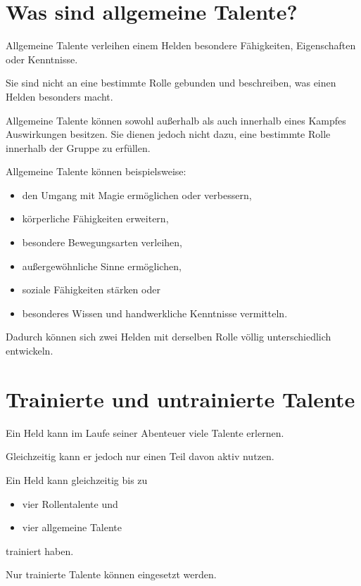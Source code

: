 \section{Was sind allgemeine Talente?}

Allgemeine Talente verleihen einem Helden besondere Fähigkeiten, Eigenschaften oder Kenntnisse.

Sie sind nicht an eine bestimmte Rolle gebunden und beschreiben, was einen Helden besonders macht.

Allgemeine Talente können sowohl außerhalb als auch innerhalb eines Kampfes Auswirkungen besitzen. Sie dienen jedoch nicht dazu, eine bestimmte Rolle innerhalb der Gruppe zu erfüllen.

Allgemeine Talente können beispielsweise:

\begin{itemize}
  \item den Umgang mit Magie ermöglichen oder verbessern,
  \item körperliche Fähigkeiten erweitern,
  \item besondere Bewegungsarten verleihen,
  \item außergewöhnliche Sinne ermöglichen,
  \item soziale Fähigkeiten stärken oder
  \item besonderes Wissen und handwerkliche Kenntnisse vermitteln.
\end{itemize}

Dadurch können sich zwei Helden mit derselben Rolle völlig unterschiedlich entwickeln.

\section{Trainierte und untrainierte Talente}

Ein Held kann im Laufe seiner Abenteuer viele Talente erlernen.

Gleichzeitig kann er jedoch nur einen Teil davon aktiv nutzen.

Ein Held kann gleichzeitig bis zu

\begin{itemize}
  \item vier Rollentalente und
  \item vier allgemeine Talente
\end{itemize}

trainiert haben.

Nur trainierte Talente können eingesetzt werden.

